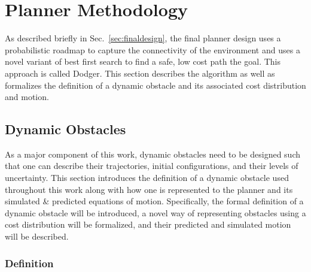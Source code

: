 


\chapter{Planner Methodology}

\label{chapter:methodology}

As described briefly in Sec.~\ref{sec:finaldesign}, the final planner design
uses a probabilistic roadmap to capture the connectivity of the environment and
uses a novel variant of best first search to find a safe, low cost path the
goal. This approach is called Dodger. This section describes the algorithm as
well as formalizes the definition of a dynamic obstacle and its associated cost
distribution and motion.

\section{Dynamic Obstacles}

As a major component of this work, dynamic obstacles need to be designed such
that one can describe their trajectories, initial configurations, and their
levels of uncertainty. This section introduces the definition of a dynamic
obstacle used throughout this work along with how one is represented to the
planner and its simulated \& predicted equations of motion. Specifically, the
formal definition of a dynamic obstacle will be introduced, a novel way of
representing obstacles using a cost distribution will be formalized, and their
predicted and simulated motion will be described.

\subsection{Definition}

\label{sec:def}

